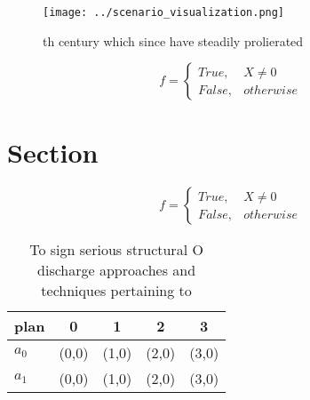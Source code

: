 \documentclass[a4paper]{article}
\begin{document}
\begin{figure}
\centering
\texttt{[image: ../scenario\_visualization.png]}
\caption{th century which since have steadily prolierated 
}
\end{figure}
 
\begin{equation}   f =
\begin{cases} True, & X \neq 0\\
False, & otherwise
\end{cases}
\end{equation}

\section{Section}

\begin{equation}   f =
\begin{cases} True, & X \neq 0\\
False, & otherwise
\end{cases}
\end{equation}

\begin{table}
\begin{adjustbox}{width=0.5\columnwidth}
\begin{tabular}{|l|l|l|l|l|}
\hline
\textbf{plan} & \multicolumn{1}{c|}{\textbf{0}} & \multicolumn{1}{c|}{\textbf{1}} & \multicolumn{1}{c|}{\textbf{2}} & \multicolumn{1}{c|}{\textbf{3}} \\ \hline
\textbf{$a_0$}  & (0,0) & (1,0) & (2,0) & (3,0) \\ \hline
\textbf{$a_1$}  & (0,0) & (1,0) & (2,0) & (3,0) \\ \hline
\end{tabular}
\end{adjustbox}
\caption{To sign serious structural O discharge approaches and techniques pertaining to 
}
\end{table}
\end{document}
